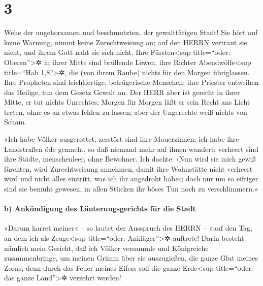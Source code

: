 \hypertarget{section-2}{%
\section{3}\label{section-2}}

 Wehe der ungehorsamen und beschmutzten, der gewalttätigen
Stadt!  Sie hört auf keine Warnung, nimmt keine
Zurechtweisung an; auf den HERRN vertraut sie nicht, und ihrem Gott naht
sie sich nicht.  Ihre Fürsten\textless sup title=``oder:
Oberen''\textgreater✲ in ihrer Mitte sind brüllende Löwen, ihre Richter
Abendwölfe\textless sup title=``Hab 1,8''\textgreater✲, die (von ihrem
Raube) nichts für den Morgen übriglassen.  Ihre Propheten
sind leichtfertige, betrügerische Menschen; ihre Priester entweihen das
Heilige, tun dem Gesetz Gewalt an.  Der HERR aber ist
gerecht in ihrer Mitte, er tut nichts Unrechtes; Morgen für Morgen läßt
er sein Recht ans Licht treten, ohne es an etwas fehlen zu lassen; aber
der Ungerechte weiß nichts von Scham.

 »Ich habe Völker ausgerottet, zerstört sind ihre
Mauerzinnen; ich habe ihre Landstraßen öde gemacht, so daß niemand mehr
auf ihnen wandert; verheert sind ihre Städte, menschenleer, ohne
Bewohner.  Ich dachte: ›Nun wird sie mich gewiß fürchten,
wird Zurechtweisung annehmen, damit ihre Wohnstätte nicht verheert wird
und nicht alles eintritt, was ich ihr angedroht habe‹; doch nur um so
eifriger sind sie bemüht gewesen, in allen Stücken ihr böses Tun noch zu
verschlimmern.«

\hypertarget{b-ankuxfcndigung-des-luxe4uterungsgerichts-fuxfcr-die-stadt}{%
\paragraph{b) Ankündigung des Läuterungsgerichts für die
Stadt}\label{b-ankuxfcndigung-des-luxe4uterungsgerichts-fuxfcr-die-stadt}}

 »Darum harret meiner« -- so lautet der Ausspruch des
HERRN -- »auf den Tag, an dem ich als Zeuge\textless sup title=``oder:
Ankläger''\textgreater✲ auftrete! Darin besteht nämlich mein Gericht,
daß ich Völker versammle und Königreiche zusammenbringe, um meinen Grimm
über sie auszugießen, die ganze Glut meines Zorns; denn durch das Feuer
meines Eifers soll die ganze Erde\textless sup title=``oder: das ganze
Land''\textgreater✲ verzehrt werden!


